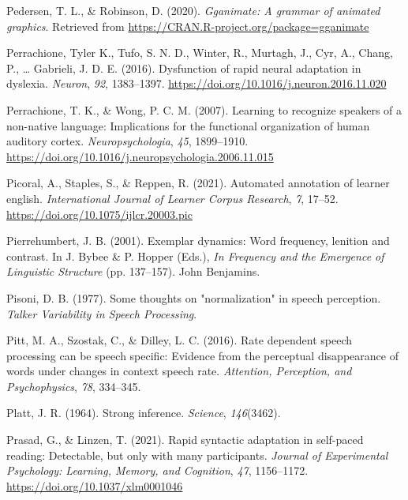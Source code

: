 \documentclass[
  11pt,
  man,floatsintext]{apa6}
\newlength{\cslhangindent}
\newlength{\cslentryspacingunit} %
\newenvironment{CSLReferences}[2] %
 {%
  \setlength{\parindent}{0pt}
  \ifodd #1
  \let\oldpar\par
  \def\par{\hangindent=\cslhangindent\oldpar}
  \fi
  \setlength{\parskip}{#2\cslentryspacingunit}
 }%
 {}
\begin{document}
\begin{CSLReferences}{1}{0}
\leavevmode{}%
Pedersen, T. L., \& Robinson, D. (2020). \emph{Gganimate: A grammar of animated graphics}. Retrieved from \url{https://CRAN.R-project.org/package=gganimate}

\leavevmode{}%
Perrachione, Tyler K., Tufo, S. N. D., Winter, R., Murtagh, J., Cyr, A., Chang, P., \ldots{} Gabrieli, J. D. E. (2016). Dysfunction of rapid neural adaptation in dyslexia. \emph{Neuron}, \emph{92}, 1383--1397. \url{https://doi.org/10.1016/j.neuron.2016.11.020}

\leavevmode{}%
Perrachione, T. K., \& Wong, P. C. M. (2007). Learning to recognize speakers of a non-native language: Implications for the functional organization of human auditory cortex. \emph{Neuropsychologia}, \emph{45}, 1899--1910. \url{https://doi.org/10.1016/j.neuropsychologia.2006.11.015}

\leavevmode{}%
Picoral, A., Staples, S., \& Reppen, R. (2021). Automated annotation of learner english. \emph{International Journal of Learner Corpus Research}, \emph{7}, 17--52. \url{https://doi.org/10.1075/ijlcr.20003.pic}

\leavevmode{}%
Pierrehumbert, J. B. (2001). Exemplar dynamics: Word frequency, lenition and contrast. In J. Bybee \& P. Hopper (Eds.), \emph{In Frequency and the Emergence of Linguistic Structure} (pp. 137--157). John Benjamins.

\leavevmode{}%
Pisoni, D. B. (1977). Some thoughts on "normalization" in speech perception. \emph{Talker Variability in Speech Processing}.

\leavevmode{}%
Pitt, M. A., Szostak, C., \& Dilley, L. C. (2016). Rate dependent speech processing can be speech specific: Evidence from the perceptual disappearance of words under changes in context speech rate. \emph{Attention, Perception, and Psychophysics}, \emph{78}, 334--345.

\leavevmode{}%
Platt, J. R. (1964). Strong inference. \emph{Science}, \emph{146}(3462).

\leavevmode{}%
Prasad, G., \& Linzen, T. (2021). Rapid syntactic adaptation in self-paced reading: Detectable, but only with many participants. \emph{Journal of Experimental Psychology: Learning, Memory, and Cognition}, \emph{47}, 1156--1172. \url{https://doi.org/10.1037/xlm0001046}


\end{CSLReferences}
\end{document}
